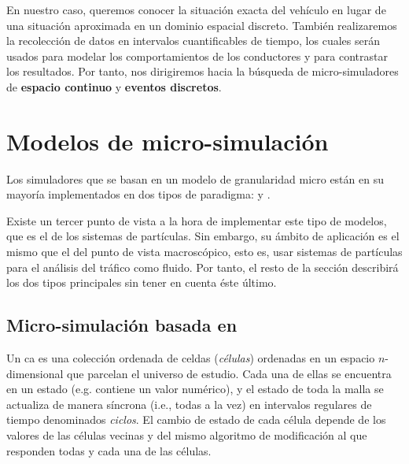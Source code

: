 En nuestro caso, queremos conocer la situación exacta del vehículo en lugar de una situación aproximada en un dominio espacial discreto. También realizaremos la recolección de datos en intervalos cuantificables de tiempo, los cuales serán usados para modelar los comportamientos de los conductores y para contrastar los resultados. Por tanto, nos dirigiremos hacia la búsqueda de micro-simuladores de \textbf{espacio continuo} y \textbf{eventos discretos}.

\section{Modelos de micro-simulación}

Los simuladores que se basan en un modelo de granularidad micro están en su mayoría implementados en dos tipos de paradigma:  y .

Existe un tercer punto de vista a la hora de implementar este tipo de modelos, que es el de los sistemas de partículas. Sin embargo, su ámbito de aplicación es el mismo que el del punto de vista macroscópico, esto es, usar sistemas de partículas para el análisis del tráfico como fluido. Por tanto, el resto de la sección describirá los dos tipos principales sin tener en cuenta éste último.

\subsection{Micro-simulación basada en }

Un \Acrfull{ca} es una colección ordenada de celdas (\textit{células}) ordenadas en un espacio $n$-dimensional que parcelan el universo de estudio. Cada una de ellas se encuentra en un estado (e.g. contiene un valor numérico), y el estado de toda la malla se actualiza de manera síncrona (i.e., todas a la vez) en intervalos regulares de tiempo denominados \textit{ciclos}. El cambio de estado de cada célula depende de los valores de las células vecinas y del mismo algoritmo de modificación al que responden todas y cada una de las células.


